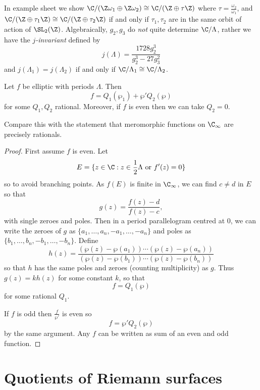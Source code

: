 \documentclass[a4paper]{article}
\begin{document}
\begin{remark}
  In example sheet we show \(\C/(\Z\omega_1 \oplus \Z\omega_2) \cong \C/(\Z \oplus \tau \Z)\) where \(\tau = \frac{\omega_2}{\omega_1}\), and \(\C/(\Z \oplus \tau_1\Z) \cong \C/(\Z \oplus \tau_2\Z)\) if and only if \(\tau_1, \tau_2\) are in the same orbit of action of \(\SL_2(\Z)\). Algebraically, \(g_2, g_3\) do \emph{not} quite determine \(\C/\Lambda\), rather we have the \emph{\(j\)-invariant} defined by
  \[
    j(\Lambda) = \frac{1728g_2^3}{g_2^3 - 27 g_3^2}
  \]
  and \(j(\Lambda_1) = j(\Lambda_2)\) if and only if \(\C/\Lambda_1 \cong \C/\Lambda_2\).
\end{remark}

\begin{theorem}
  Let \(f\) be elliptic with periods \(\Lambda\). Then
  \[
    f = Q_1(\wp_1) + \wp' Q_2(\wp)
  \]
  for some \(Q_1, Q_2\) rational. Moreover, if \(f\) is even then we can take \(Q_2 = 0\).
\end{theorem}

Compare this with the statement that meromorphic functions on \(\C_\infty\) are precisely rationals.

\begin{proof}
  First assume \(f\) is even. Let
  \[
    E = \{z \in \C: z \in \frac{1}{2} \Lambda \text{ or } f'(z) = 0\}
  \]
  so to avoid branching points. As \(f(E)\) is finite in \(\C_\infty\), we can find \(c \neq d\) in \(E\) so that
  \[
    g(z) = \frac{f(z) - d}{f(z) - c},
  \]
  with single zeroes and poles. Then in a period parallelogram centred at \(0\), we can write the zeroes of \(g\) as \(\{a_1, \dots, a_n, -a_1, \dots, -a_n\}\) and poles as \(\{b_1, \dots, b_n, -b_1, \dots, -b_n\}\). Define
  \[
    h(z) = \frac{(\wp(z) - \wp(a_1)) \cdots (\wp(z) - \wp(a_n))}{(\wp(z) - \wp(b_1)) \cdots (\wp(z) - \wp(b_n))}
  \]
  so that \(h\) has the same poles and zeroes (counting multiplicity) as \(g\). Thus \(g(z) = kh(z)\) for some constant \(k\), so that
  \[
    f = Q_1(\wp)
  \]
  for some rational \(Q_1\).

  If \(f\) is odd then \(\frac{f}{\wp'}\) is even so
  \[
    f = \wp' Q_2(\wp)
  \]
  by the same argument. Any \(f\) can be written as sum of an even and odd function.
\end{proof}

\section{Quotients of Riemann surfaces}
\end{document}
